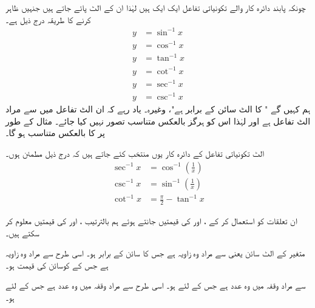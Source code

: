 چونکہ پابند دائرہ کار والے تکونیاتی تفاعل ایک ایک ہیں لہٰذا ان کے الٹ پائے جاتے ہیں جنہیں ظاہر کرنے کا طریقہ درج ذیل ہے۔
\begin{align*}
y&=\sin^{-1}x\\
y&=\cos^{-1}x\\
y&=\tan^{-1}x\\
y&=\cot^{-1}x\\
y&=\sec^{-1}x\\
y&=\csc^{-1}x
\end{align*}
ہم کہیں گے " کا الٹ سائن  کے برابر ہے"، وغیرہ۔ یاد رہے کہ ان الٹ تفاعل میں  سے مراد الٹ تفاعل ہے اور لہٰذا اس کو ہرگز بالعکس متناسب تصور نہیں کیا جائے۔ مثال کے طور پر  کا بالعکس متناسب  ہو گا۔

الٹ تکونیاتی تفاعل کے دائرہ کار یوں منتخب کئے جاتے ہیں کہ درج ذیل مطمئن ہوں۔
\begin{align}
\sec^{-1}x&=\cos^{-1}(\tfrac{1}{x})\label{مساوات_ماورائی_چند_تماثل_الف}\\
\csc^{-1}x&=\sin^{-1}(\tfrac{1}{x})\label{مساوات_ماورائی_چند_تماثل_ب}\\
\cot^{-1}x&=\tfrac{\pi}{2}-\tan^{-1}x \label{مساوات_ماورائی_چند_تماثل_ج}
\end{align}

ان تعلقات کو استعمال کر کے ،  اور  کی قیمتیں جانتے ہوئے ہم بالترتیب ،  اور  کی قیمتیں معلوم کر سکتے ہیں۔

 متغیر  کے الٹ سائن یعنی  سے مراد وہ زاویہ ہے جس کا سائن  کے برابر ہو۔ اسی طرح  سے مراد وہ زاویہ ہے جس کے کوسائن کی قیمت  ہو۔

 سے مراد وقفہ  میں وہ عدد  ہے جس کے لئے  ہو۔ اسی طرح 
 سے مراد وقفہ  میں وہ عدد  ہے جس کے لئے  ہو۔

